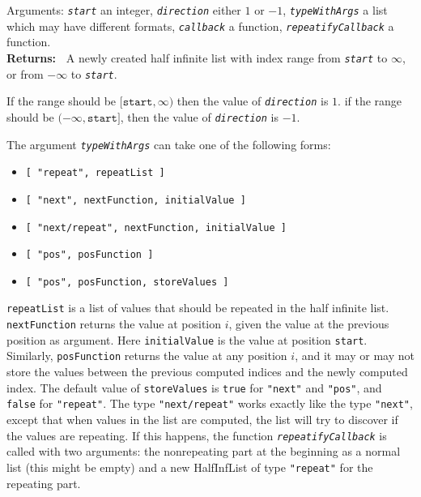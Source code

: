 \documentclass[a4paper,11pt]{report}
\begin{document}
{{{Arguments: \mbox{\texttt{\mdseries\slshape start}} \texttt{}\texttt{} an integer, \mbox{\texttt{\mdseries\slshape direction}} \texttt{}\texttt{} either $1$ or $-1$, \mbox{\texttt{\mdseries\slshape typeWithArgs}} \texttt{}\texttt{} a list which may have different
formats, \mbox{\texttt{\mdseries\slshape callback}} \texttt{}\texttt{} a function, \mbox{\texttt{\mdseries\slshape repeatifyCallback}} \texttt{}\texttt{} a function. \\
 \textbf{\indent Returns:\ }
A newly created half infinite list with index range from \mbox{\texttt{\mdseries\slshape start}} to $\infty$, or from $-\infty$ to \mbox{\texttt{\mdseries\slshape start}}.



 If the range should be $[\mathtt{start},\infty)$ then the value of \mbox{\texttt{\mdseries\slshape direction}} is $1$. if the range should be $(-\infty,\mathtt{start}]$, then the value of \mbox{\texttt{\mdseries\slshape direction}} is $-1$. 

 The argument \mbox{\texttt{\mdseries\slshape typeWithArgs}} can take one of the following forms: 
\begin{itemize}
\item \texttt{[ "repeat", repeatList ]}
\item \texttt{[ "next", nextFunction, initialValue ]}
\item \texttt{[ "next/repeat", nextFunction, initialValue ]}
\item \texttt{[ "pos", posFunction ]}
\item \texttt{[ "pos", posFunction, storeValues ]}
\end{itemize}
 \texttt{repeatList} is a list of values that should be repeated in the half infinite list. \texttt{nextFunction} returns the value at position $i$, given the value at the previous position as argument. Here \texttt{initialValue} is the value at position \texttt{start}. Similarly, \texttt{posFunction} returns the value at any position $i$, and it may or may not store the values between the previous computed indices
and the newly computed index. The default value of \texttt{storeValues} is \texttt{true} for \texttt{"next"} and \texttt{"pos"}, and \texttt{false} for \texttt{"repeat"}. The type \texttt{"next/repeat"} works exactly like the type \texttt{"next"}, except that when values in the list are computed, the list will try to
discover if the values are repeating. If this happens, the function \mbox{\texttt{\mdseries\slshape repeatifyCallback}} is called with two arguments: the non\texttt{}repeating part at the
beginning as a normal list (this might be empty) and a new HalfInfList of type \texttt{"repeat"} for the repeating part. 

}}}
\end{document}
